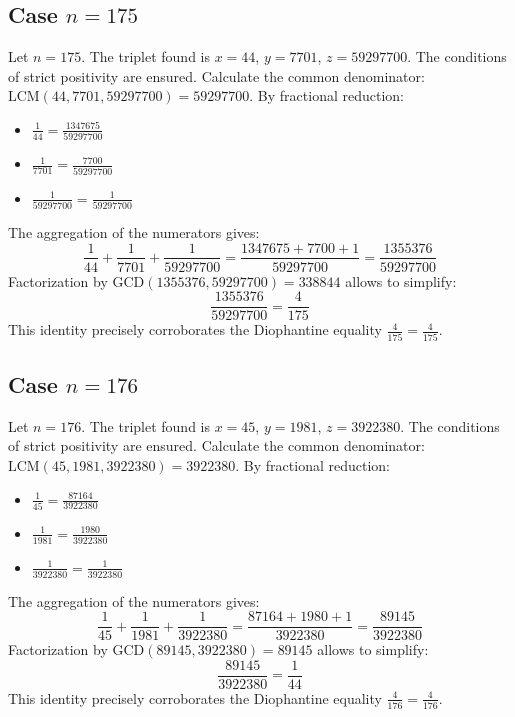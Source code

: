 \documentclass[11pt,a4paper]{article}
\begin{document}
\subsection{Case $n = 175$}
Let $n = 175$. The triplet found is $x = 44$, $y = 7701$, $z = 59297700$.
The conditions of strict positivity are ensured.
Calculate the common denominator: $\text{LCM}(44, 7701, 59297700) = 59297700$.
By fractional reduction:
\begin{itemize}
    \item $\frac{1}{44} = \frac{1347675}{59297700}$
    \item $\frac{1}{7701} = \frac{7700}{59297700}$
    \item $\frac{1}{59297700} = \frac{1}{59297700}$
\end{itemize}
The aggregation of the numerators gives:
$$ \frac{1}{44} + \frac{1}{7701} + \frac{1}{59297700} = \frac{1347675 + 7700 + 1}{59297700} = \frac{1355376}{59297700} $$
Factorization by $\text{GCD}(1355376, 59297700) = 338844$ allows to simplify:
$$ \frac{1355376}{59297700} = \frac{4}{175} $$
This identity precisely corroborates the Diophantine equality $\frac{4}{175} = \frac{4}{175}$.

\subsection{Case $n = 176$}
Let $n = 176$. The triplet found is $x = 45$, $y = 1981$, $z = 3922380$.
The conditions of strict positivity are ensured.
Calculate the common denominator: $\text{LCM}(45, 1981, 3922380) = 3922380$.
By fractional reduction:
\begin{itemize}
    \item $\frac{1}{45} = \frac{87164}{3922380}$
    \item $\frac{1}{1981} = \frac{1980}{3922380}$
    \item $\frac{1}{3922380} = \frac{1}{3922380}$
\end{itemize}
The aggregation of the numerators gives:
$$ \frac{1}{45} + \frac{1}{1981} + \frac{1}{3922380} = \frac{87164 + 1980 + 1}{3922380} = \frac{89145}{3922380} $$
Factorization by $\text{GCD}(89145, 3922380) = 89145$ allows to simplify:
$$ \frac{89145}{3922380} = \frac{1}{44} $$
This identity precisely corroborates the Diophantine equality $\frac{4}{176} = \frac{4}{176}$.
\end{document}
